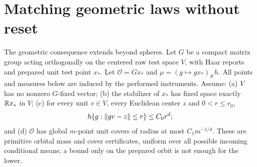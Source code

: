 \section{Matching geometric laws without reset}\label{sec:orbit-laws}
The geometric consequence extends beyond spheres. Let $G$ be a compact matrix group acting orthogonally on the centered raw test space $V$, with Haar reports and prepared unit test point $x_*$. Let $\mathcal O=Gx_*$ and $\mu=(g\mapsto gx_*)_\#h$. All points and measures below are induced by the performed instruments. Assume: (a) $V$ has no nonzero $G$-fixed vector; (b) the stabilizer of $x_*$ has fixed space exactly $\mathbb R x_*$ in $V$; (c) for every unit $v\in V$, every Euclidean center $z$ and $0<r\le r_0$,
\[
 h\{g:\left\lVert gv-z\right\rVert\le r\}\le C_0r^d;
\]
and (d) $\mathcal O$ has global $m$-point unit covers of radius at most $C_1m^{-1/d}$. These are primitive orbital mass and cover certificates, uniform over all possible incoming conditional means; a bound only on the prepared orbit is not enough for the lower.

